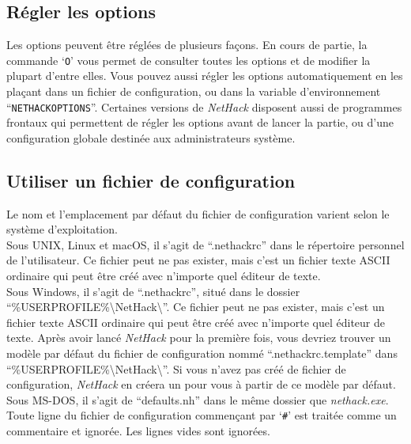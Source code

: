 \documentclass[titlepage]{article}
\begin{document}
\subsection*{Régler les options}

Les options peuvent être réglées de plusieurs façons. En cours de partie, la commande `\texttt{O}'
vous permet de consulter toutes les options et de modifier la plupart d'entre elles.
Vous pouvez aussi régler les options automatiquement en les plaçant dans un fichier
de configuration, ou dans la variable d'environnement ``\texttt{NETHACKOPTIONS}''.
Certaines versions de \textit{NetHack} disposent aussi de programmes frontaux qui
permettent de régler les options avant de lancer la partie, ou d'une configuration
globale destinée aux administrateurs système.

\subsection*{Utiliser un fichier de configuration}

Le nom et l'emplacement par défaut du fichier de configuration varient selon le
système d'exploitation.\\

Sous UNIX, Linux et macOS, il s'agit de \mbox{``.nethackrc''} dans le répertoire
personnel de l'utilisateur.
Ce fichier peut ne pas exister, mais c'est un fichier texte ASCII ordinaire qui
peut être créé avec n'importe quel éditeur de texte.\\

Sous Windows, il s'agit de \mbox{``.nethackrc''}, situé dans le dossier
\mbox{{``\%USERPROFILE\%\textbackslash NetHack\textbackslash''}}.
Ce fichier peut ne pas exister,
mais c'est un fichier texte ASCII ordinaire qui peut être créé avec n'importe quel
éditeur de texte.
Après avoir lancé \textit{NetHack} pour la première fois, vous devriez trouver un modèle
par défaut du fichier de configuration nommé \mbox{``.nethackrc.template''} dans
\mbox{{``\%USERPROFILE\%\textbackslash NetHack\textbackslash''}}.
Si vous n'avez pas créé de fichier de configuration, \textit{NetHack} en créera
un pour vous à partir de ce modèle par défaut.\\

Sous MS-DOS, il s'agit de \mbox{``defaults.nh''} dans le même dossier que
\mbox{\textit{nethack.exe}}.\\

Toute ligne du fichier de configuration commençant par `\texttt{\#}' est traitée
comme un commentaire et ignorée.
Les lignes vides sont ignorées.
\end{document}
